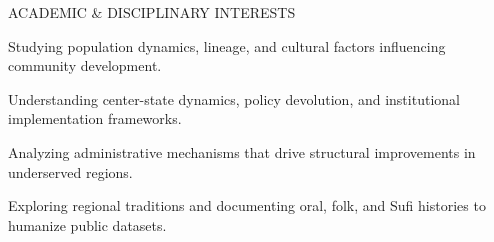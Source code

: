 \begin{rubric}{ACADEMIC \& DISCIPLINARY INTERESTS}

Studying population dynamics, lineage, and cultural factors influencing community development.

Understanding center-state dynamics, policy devolution, and institutional implementation frameworks.

Analyzing administrative mechanisms that drive structural improvements in underserved regions.

Exploring regional traditions and documenting oral, folk, and Sufi histories to humanize public datasets.

\end{rubric}